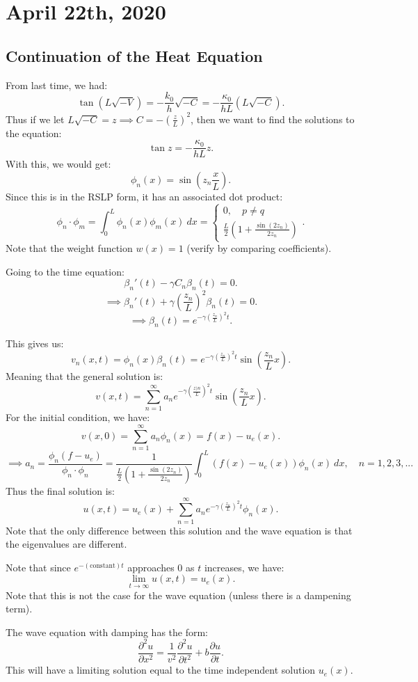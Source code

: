 \documentclass[../main/main.tex]{subfiles}
\begin{document}
\section{April 22th, 2020}
\subsection{Continuation of the Heat Equation}
From last time, we had: \[
	\tan (L \sqrt{-V}) = -\frac{k_0}{h}\sqrt{-C} = -\frac{\kappa_0}{hL}(L\sqrt{-C} ) 
.\] Thus if we let $L \sqrt{-C}  = z \implies C = - \left( \frac{z}{L} \right) ^2$, then we want to find the solutions to the equation: \[
\tan z = - \frac{\kappa_0}{hL}z
.\] With this, we would get: \[
\phi_n(x) = \sin(z_n \frac{x}{L})
.\] Since this is in the RSLP form, it has an associated dot product: \[
\phi_n\cdot \phi_m = \int^L_0 \phi_n(x) \phi_m(x) ~dx =  \begin{cases}
	0 , \quad p \neq q \\
	\frac{L}{2}\left( 1+\frac{\sin(2z_n)}{2z_n} \right) 
\end{cases}
.\] Note that the weight function $w(x) = 1$ (verify by comparing coefficients).

Going to the time equation: \[
	\beta_n'(t) - \gamma C_n \beta_n(t) = 0
.\] \[
\implies \beta_n'(t) + \gamma \left( \frac{z_n}{L} \right) ^2 \beta_n (t) = 0
.\] \[
\implies \beta_n(t) = e^{-\gamma\left( \frac{z_n}{L} \right) ^2 t}
.\] 

This gives us: \[
	v_n(x,t) = \phi_n(x) \beta_n(t) = e^{-\gamma\left( \frac{z_n}{L} \right) ^2 t} \sin \left( \frac{z_n}{L}x \right) 
.\] Meaning that the general solution is: \[
v(x,t) = \sum_{n=1}^{\infty} a_n e^{-\gamma\left( \frac{z)n}{L} \right) ^2t}\sin\left( \frac{z_n}{L}x \right) 
.\] For the initial condition, we have: \[
v(x,0) = \sum_{n=1}^{\infty} a_n \phi_n(x) = f(x) - u_e(x)
.\] \[
\implies a_n = \frac{ \phi_n\left( f-u_e \right) }{\phi_n\cdot \phi_n} =  \frac{1}{\frac{L}{2}\left( 1+ \frac{\sin(2z_n)}{2z_n} \right) }\int^L_0 (f(x) - u_e(x) ) \phi_n(x) ~dx, \quad n=1,2,3,..
.\] Thus the final solution is: \[
u(x,t) = u_e(x) + \sum_{n=1}^{\infty} a_n e^{-\gamma\left( \frac{z_n}{L} \right) ^2t}\phi_n(x)
.\] Note that the only difference between this solution and the wave equation is that the eigenvalues are different.

\begin{remark}
	Note that since $e^{-(\text{constant})t}$ approaches $0$ as $t$ increases, we have: \[
		\lim\limits_{t \to \infty} u(x,t) = u_e(x)
	.\] Note that this is not the case for the wave equation (unless there is a dampening term).
\end{remark}
\begin{remark}
	The wave equation with damping has the form: \[
	\frac{\partial ^2 u}{\partial x^2} = \frac{1}{v^2}\frac{\partial ^2 u}{\partial t^2} + b \frac{\partial u}{\partial t}  
.\] This will have a limiting solution equal to the time independent solution $u_e(x)$.
\end{remark}
\end{document}
